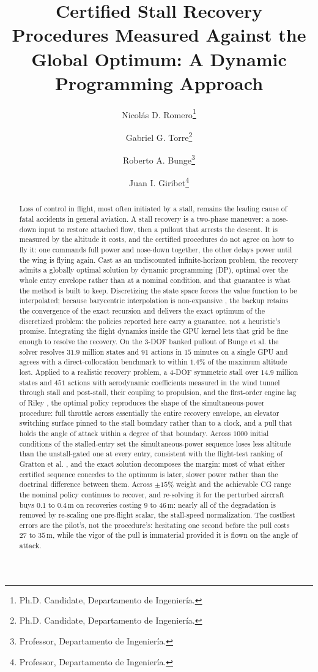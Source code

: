 \documentclass[journal ]{new-aiaa}
\title{Certified Stall Recovery Procedures Measured Against the Global Optimum: A Dynamic Programming Approach}
\author{Nicol\'as D. Romero\footnote{Ph.D. Candidate, Departamento de Ingenier\'ia.}}
\affil{Business or Academic Affiliation 1, City, State, Zip Code, Country}
\author{Gabriel G. Torre\footnote{Ph.D. Candidate, Departamento de Ingenier\'ia.}}
\affil{Business or Academic Affiliation 2, City, State, Zip Code, Country}
\author{Roberto A. Bunge\footnote{Professor, Departamento de Ingenier\'ia.}}
\affil{Business or Academic Affiliation 4, City, State, Zip Code, Country}
\author{Juan I. Giribet\footnote{Professor, Departamento de Ingenier\'ia.}}
\affil{Business or Academic Affiliation 3, City, Province, Zip Code, Country}
\begin{document}
\maketitle

\begin{abstract}
Loss of control in flight, most often initiated by a stall, remains the
leading cause of fatal accidents in general aviation. A stall recovery
is a two-phase maneuver: a nose-down input to restore attached flow,
then a pullout that arrests the descent. It is measured by the altitude
it costs, and the certified procedures do not agree on how to fly it:
one commands full power and nose-down together, the other delays
power until the wing is flying again. Cast as an
undiscounted infinite-horizon problem, the recovery admits a globally
optimal solution by dynamic programming (DP), optimal over the whole entry
envelope rather than at a nominal condition, and that guarantee is
what the method is built to keep. Discretizing the state
space forces the value function to be interpolated; because
barycentric interpolation is non-expansive \cite{Munos1998}, the
backup retains the convergence of the exact recursion and delivers
the exact optimum of the
discretized problem: the policies reported here carry a guarantee, not
a heuristic's promise. Integrating the flight dynamics inside the GPU
kernel lets that grid be fine enough to resolve the recovery. On
the 3-DOF banked pullout of Bunge et al. \cite{Bunge2018} the solver
resolves $31.9$ million states and $91$ actions in $15$ minutes on a
single GPU and
agrees with a direct-collocation benchmark to within $1.4\%$ of the
maximum altitude lost. Applied to a realistic recovery problem, a
4-DOF symmetric stall over $14.9$ million states and $451$ actions
with aerodynamic coefficients measured in the wind tunnel through
stall and post-stall, their coupling to propulsion, and the
first-order engine lag of Riley \cite{Riley1985}, the optimal
policy reproduces the shape of the simultaneous-power procedure: full
throttle across essentially the entire recovery envelope, an elevator
switching surface pinned
to the stall boundary rather than to a clock, and a pull that holds the
angle of attack within a degree of that boundary. Across $1000$ initial
conditions of the stalled-entry set the simultaneous-power sequence
loses less altitude than the unstall-gated one at every entry,
consistent with the flight-test ranking of Gratton et al.
\cite{Gratton2014}, and the exact solution decomposes the margin: most
of what either certified sequence concedes to the optimum is later,
slower power rather than the doctrinal difference between them. Across $\pm 15\%$ weight
and the achievable CG range the nominal policy continues to recover,
and re-solving it for the perturbed aircraft buys $0.1$ to $0.4$\,m on
recoveries costing $9$ to $46$\,m: nearly all of the degradation is
removed by re-scaling one pre-flight scalar, the stall-speed
normalization. The costliest errors are the pilot's, not the
procedure's: hesitating one second before the pull costs $27$ to
$35$\,m, while the vigor of the pull is immaterial provided it is flown
on the angle of attack.
\end{abstract}
\end{document}
